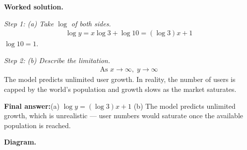 \documentclass[11pt]{article}
\begin{document}
\textbf{Worked solution.}

\textit{Step 1: (a) Take \( \log \) of both sides.}
\[\begin{gathered}
\log y = x\log 3 + \log 10 = (\log 3)x + 1
\end{gathered}\]
\( \log 10 = 1 \).

\textit{Step 2: (b) Describe the limitation.}
\[\begin{gathered}
\text{As } x \to \infty, \; y \to \infty
\end{gathered}\]
The model predicts unlimited user growth. In reality, the number of users is capped by the world's population and growth slows as the market saturates.

\begin{answerbox}
\textbf{Final answer:}\quad (a) \(\displaystyle  \log y = (\log 3)x + 1 \) \quad  (b) The model predicts unlimited growth, which is unrealistic --- user numbers would saturate once the available population is reached.
\end{answerbox}
\textbf{Diagram.}
\end{document}

